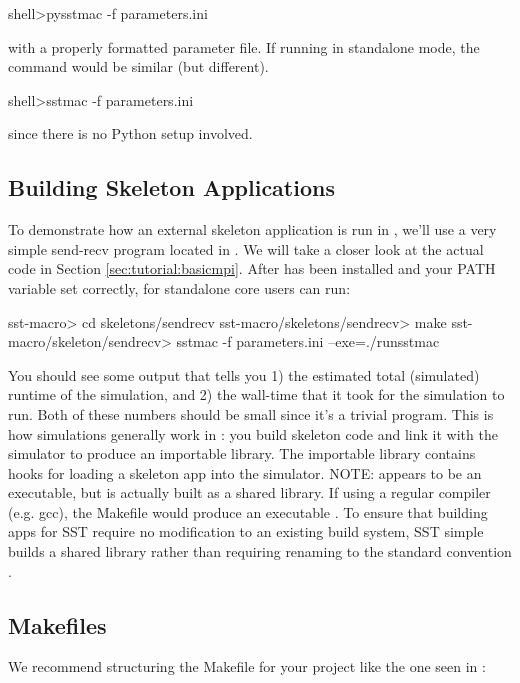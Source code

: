 \begin{ShellCmd}
shell>pysstmac -f parameters.ini
\end{ShellCmd}
with a properly formatted parameter file. If running in standalone mode, the command would be similar (but different).

\begin{ShellCmd}
shell>sstmac -f parameters.ini
\end{ShellCmd}
since there is no Python setup involved.

\subsection{Building Skeleton Applications}
\label{sec:tutorial:runapp}

To demonstrate how an external skeleton application is run in \sstmacro, we'll use a very simple send-recv program located in .
We will take a closer look at the actual code in Section \ref{sec:tutorial:basicmpi}.
After \sstmacro has been installed and your PATH variable set correctly, for standalone core users can run:

\begin{ShellCmd}
sst-macro> cd skeletons/sendrecv
sst-macro/skeletons/sendrecv> make
sst-macro/skeleton/sendrecv> sstmac -f parameters.ini --exe=./runsstmac
\end{ShellCmd}

You should see some output that tells you 1) the estimated total (simulated) runtime of the simulation, and 
2) the wall-time that it took for the simulation to run.  
Both of these numbers should be small since it's a trivial program. 
This is how simulations generally work in \sstmacro: you build skeleton code and link it with the simulator to produce an importable library.  
The importable library contains hooks for loading a skeleton app into the simulator.
NOTE:  appears to be an executable, but is actually built as a shared library. 
If using a regular compiler (e.g. gcc), the Makefile would produce an executable .
To ensure that building apps for SST require no modification to an existing build system,
SST simple builds a shared library  rather than requiring renaming to the standard convention
.

\subsection{Makefiles}
\label{subsec:tutorial:makefiles}
We recommend structuring the Makefile for your project like the one seen in  :

